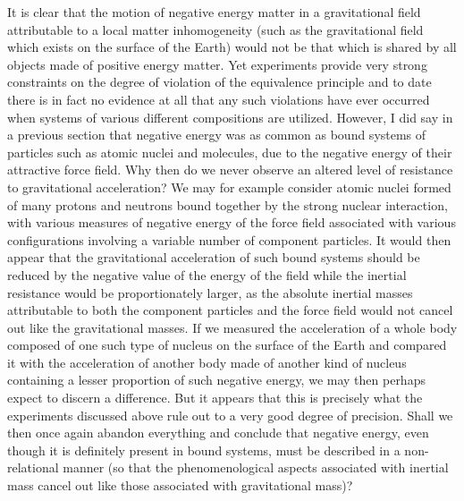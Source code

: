 \documentclass[notitlepage,12pt]{report}
\begin{document}
It is clear that the motion of negative energy matter in a gravitational field attributable to a local matter inhomogeneity (such as the gravitational field which exists on the surface of the Earth) would not be that which is shared by all objects made of positive energy matter. Yet experiments provide very strong constraints on the degree of violation of the equivalence principle and to date there is in fact no evidence at all that any such violations have ever occurred when systems of various different compositions are utilized. However, I did say in a previous section that negative energy was as common as bound systems of particles such as atomic nuclei and molecules, due to the negative energy of their attractive force field. Why then do we never observe an altered level of resistance to gravitational acceleration? We may for example consider atomic nuclei formed of many protons and neutrons bound together by the strong nuclear interaction, with various measures of negative energy of the force field associated with various configurations involving a variable number of component particles. It would then appear that the gravitational acceleration of such bound systems should be reduced by the negative value of the energy of the field while the inertial resistance would be proportionately larger, as the absolute inertial masses attributable to both the component particles and the force field would not cancel out like the gravitational masses. If we measured the acceleration of a whole body composed of one such type of nucleus on the surface of the Earth and compared it with the acceleration of another body made of another kind of nucleus containing a lesser proportion of such negative energy, we may then perhaps expect to discern a difference. But it appears that this is precisely what the experiments discussed above rule out to a very good degree of precision. Shall we then once again abandon everything and conclude that negative energy, even though it is definitely present in bound systems, must be described in a non-relational manner (so that the phenomenological aspects associated with inertial mass cancel out like those associated with gravitational mass)?
\end{document}
